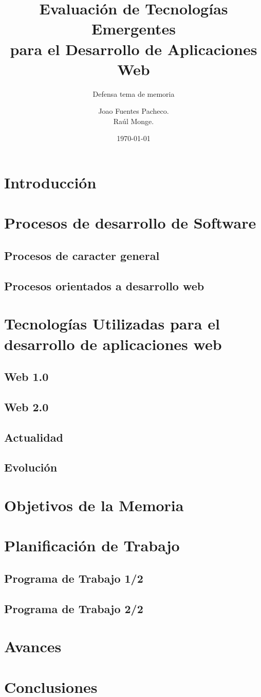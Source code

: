 \documentclass{beamer}
\title{Evaluación de Tecnologías Emergentes \\ para el Desarrollo de Aplicaciones Web}
\subtitle{Defensa tema de memoria}
\author{Joao Fuentes Pacheco.\\
		Raúl Monge.}
\institute[]{Universidad Técnica Federico Santa María}
\date{\today}
\begin{document}
    \frame{\titlepage}
    \frame{\tableofcontents}
	\section{Introducción} %
	     
	\section{Procesos de desarrollo de Software} %
	     
		\subsection{Procesos de caracter general}
			
		\subsection{Procesos orientados a desarrollo web}
			
	\section{Tecnologías Utilizadas para el desarrollo de aplicaciones web}
		
		\subsection{Web 1.0}
		    
		\subsection{Web 2.0}
		    
		\subsection{Actualidad}
		    
		\subsection{Evolución}
		     
	\section{Objetivos de la Memoria}
		
	\section{Planificación de Trabajo}
	      \subsection{Programa de Trabajo 1/2}
		
	      \subsection{Programa de Trabajo 2/2}
		
	\section{Avances}
		
	\section{Conclusiones}
		
\end{document}
